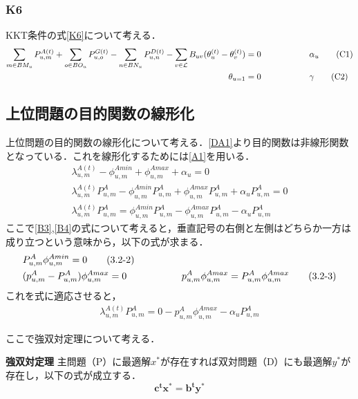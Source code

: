 \documentclass[a4j,10.5pt,fleqn]{jarticle}
\begin{document}
\subsubsection{K6}
KKT条件の式\ref{K6}について考える．\\
\begin{align}
\sum_{m\in BM_u}P^{A(t)}_{u,m}+\sum_{o\in BO_u}P^{G(t)}_{u,o}-\sum_{n\in BN_u}P^{D(t)}_{u,n}-\sum_{v\in \mathcal{L}}B_{uv}(\theta_u^{(t)}-\theta_v^{(t)})=0&\hspace{20mm}\alpha_u\label{C1}\tag{C1}\\
\theta_{u=1}=0&\hspace{20mm}\gamma\label{C2}\tag{C2}
\end{align}
\subsection{上位問題の目的関数の線形化}
上位問題の目的関数の線形化について考える．\ref{DA1}より目的関数は非線形関数となっている．これを線形化するためには\ref{A1}を用いる．
\begin{align}
\lambda^{A(t)}_{u,m}-\phi_{u,m}^{Amin}+\phi_{u,m}^{Amax}+\alpha_u=0\tag{3.2-1}\label{3.2-1}\\
\lambda^{A(t)}_{u,m}P_{u,m}^A-\phi_{u,m}^{Amin}P_{u,m}^A+\phi_{u,m}^{Amax}P_{u,m}^A+\alpha_uP_{u,m}^A=0\tag{3.2-1}\label{3.2-1}\\
\lambda^{A(t)}_{u,m}P_{u,m}^A=\phi_{u,m}^{Amin}P_{u,m}^A-\phi_{u,m}^{Amax}P_{u,m}^A-\alpha_uP_{u,m}^A\tag{3.2-1}\label{3.2-1}
\end{align}
ここで\ref{B3},\ref{B4}の式について考えると，垂直記号の右側と左側はどちらか一方は成り立つという意味から，以下の式が求まる．
\begin{align}
&P_{u,m}^A\phi_{u,m}^{Amin}=0\label{3.2-2}\tag{3.2-2}\\
&(p_{u,m}^A-P_{u,m}^A)\phi_{u,m}^{Amax}=0\hspace{20mm}p_{u,m}^A\phi_{u,m}^{Amax}=P_{u,m}^A\phi_{u,m}^{Amax}\label{3.2-3}\tag{3.2-3}
\end{align}
これを式に適応させると，
\begin{align}
\lambda^{A(t)}_{u,m}P_{u,m}^A=0-p_{u,m}^A\phi_{u,m}^{Amax}-\alpha_uP_{u,m}^A\tag{3.2-4}\label{3.2-4}
\end{align}

ここで強双対定理について考える．
\begin{itembox}[l]{\bf{強双対定理}}
主問題（P）に最適解$x^*$が存在すれば双対問題（D）にも最適解$y^*$が存在し，以下の式が成立する．
\[ \bm{c^tx^*}=\bm{b^ty^*}\]
\end{itembox}
\end{document}
